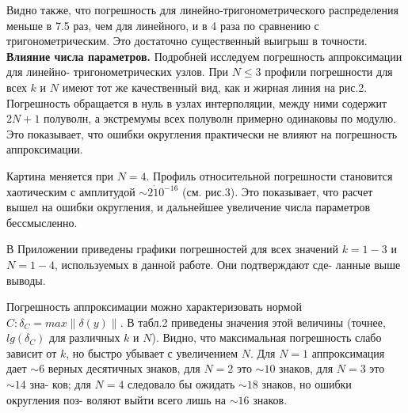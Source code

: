 Видно также, что погрешность для линейно-тригонометрического распределения меньше в 7.5 раз, чем для линейного, и в 4 раза по сравнению с тригонометрическим. Это достаточно существенный выигрыш в точности.
\\

\textbf{Влияние числа параметров.} Подробней исследуем погрешность аппроксимации для линейно-
тригонометрических узлов. При $N \leqslant 3$ профили погрешности для всех $k$ и $N$
имеют тот же качественный вид, как и жирная линия на рис.2. Погрешность
обращается в нуль в узлах интерполяции, между ними содержит $2N+1$ полуволн, а экстремумы всех полуволн примерно одинаковы по модулю. Это показывает, что ошибки округления практически не влияют на погрешность аппроксимации.

Картина меняется при $N = 4$. Профиль относительной погрешности становится хаотическим с 
амплитудой $\sim 2 \dot 10^{-16}$ (см. рис.3). Это показывает, что
расчет вышел на ошибки округления, и дальнейшее увеличение числа параметров бессмысленно.

В Приложении приведены графики погрешностей для всех значений
$k =1 - 3$ и $N = 1-4$, используемых в данной работе. Они подтверждают сде-
ланные выше выводы.

Погрешность аппроксимации можно характеризовать нормой $C: \delta_C = max\| \delta(y)\|$. 
В табл.2 приведены значения этой величины (точнее, $lg(\delta_C)$
для различных $k$ и $N$). Видно, что максимальная погрешность слабо зависит
от $k$, но быстро убывает с увеличением $N$. Для $N = 1$ аппроксимация дает $\sim 6$
верных десятичных знаков, для $N = 2$ это $\sim 10$ знаков, для $N = 3$ это $\sim 14$ зна-
ков; для $N = 4$ следовало бы ожидать $\sim 18$ знаков, но ошибки округления поз-
воляют выйти всего лишь на $\sim 16$ знаков.
\\


